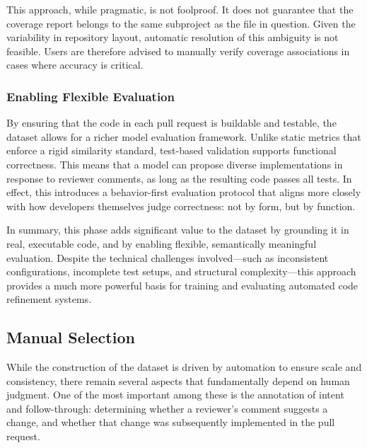 This approach, while pragmatic, is not foolproof. It does not guarantee that the coverage report
belongs to the same subproject as the file in question. Given the variability in repository layout,
automatic resolution of this ambiguity is not feasible. Users are therefore advised to manually
verify coverage associations in cases where accuracy is critical.

\subsubsection{Enabling Flexible Evaluation}

By ensuring that the code in each pull request is buildable and testable, the dataset allows for a
richer model evaluation framework. Unlike static metrics that enforce a rigid similarity standard,
test-based validation supports functional correctness. This means that a model can propose diverse
implementations in response to reviewer comments, as long as the resulting code passes all tests. In
effect, this introduces a behavior-first evaluation protocol that aligns more closely with how
developers themselves judge correctness: not by form, but by function.

In summary, this phase adds significant value to the dataset by grounding it in real, executable
code, and by enabling flexible, semantically meaningful evaluation. Despite the technical challenges
involved—such as inconsistent configurations, incomplete test setups, and structural complexity—this
approach provides a much more powerful basis for training and evaluating automated code refinement
systems.

\subsection{Manual Selection}
\label{sec:manual-selection}

While the construction of the dataset is driven by automation to ensure scale and consistency, there
remain several aspects that fundamentally depend on human judgment. One of the most important among
these is the annotation of intent and follow-through: determining whether a reviewer’s comment
suggests a change, and whether that change was subsequently implemented in the pull request.

